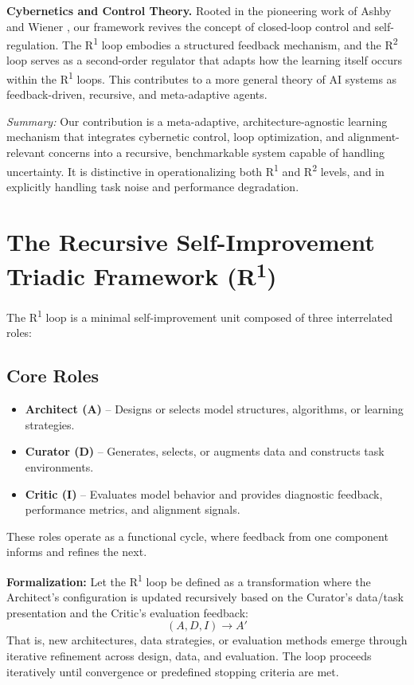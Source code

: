 \documentclass{article}
\begin{document}
\textbf{Cybernetics and Control Theory.} Rooted in the pioneering work of Ashby \cite{ashby1956introduction} and Wiener \cite{wiener1948cybernetics}, our framework revives the concept of closed-loop control and self-regulation. The R\textsuperscript{1} loop embodies a structured feedback mechanism, and the R\textsuperscript{2} loop serves as a second-order regulator that adapts how the learning itself occurs within the R\textsuperscript{1} loops. This contributes to a more general theory of AI systems as feedback-driven, recursive, and meta-adaptive agents.

\textit{Summary:} Our contribution is a meta-adaptive, architecture-agnostic learning mechanism that integrates cybernetic control, loop optimization, and alignment-relevant concerns into a recursive, benchmarkable system capable of handling uncertainty. It is distinctive in operationalizing both R\textsuperscript{1} and R\textsuperscript{2} levels, and in explicitly handling task noise and performance degradation.

\section{The Recursive Self-Improvement Triadic Framework (R\textsuperscript{1})}
The R\textsuperscript{1} loop is a minimal self-improvement unit composed of three interrelated roles:

\subsection{Core Roles}
\begin{itemize}
    \item \textbf{Architect (A)} – Designs or selects model structures, algorithms, or learning strategies.
    \item \textbf{Curator (D)} – Generates, selects, or augments data and constructs task environments.
    \item \textbf{Critic (I)} – Evaluates model behavior and provides diagnostic feedback, performance metrics, and alignment signals.
\end{itemize}
These roles operate as a functional cycle, where feedback from one component informs and refines the next.

\textbf{Formalization:}
Let the R\textsuperscript{1} loop be defined as a transformation where the Architect's configuration is updated recursively based on the Curator's data/task presentation and the Critic's evaluation feedback:
$$ (A, D, I) \rightarrow A' $$
That is, new architectures, data strategies, or evaluation methods emerge through iterative refinement across design, data, and evaluation. The loop proceeds iteratively until convergence or predefined stopping criteria are met.
\end{document}
